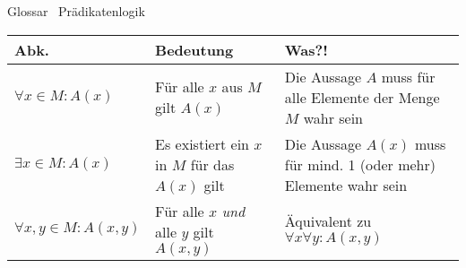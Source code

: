 \begin{frame}[fragile]{Glossar \textemdash\ Prädikatenlogik}
    \small
    \begin{tabular}{p{} p{} p{}}
        \toprule
        Abk.                         & Bedeutung                                        & Was?!                                                              \\
        \midrule
        $\forall x \in M : A(x)$     & Für alle $x$ aus $M$ gilt $A(x)$                 & Die Aussage $A$ muss für alle Elemente der Menge $M$ wahr sein     \\
        $\exists x \in M : A(x)$     & Es existiert ein $x$ in $M$ für das $A(x)$ gilt  & Die Aussage $A(x)$ muss für mind. 1 (oder mehr) Elemente wahr sein \\
        $\forall x,y \in M : A(x,y)$ & Für alle $x$ \textit{und} alle $y$ gilt $A(x,y)$ & Äquivalent zu $\forall x \forall y : A(x,y)$                       \\
        \bottomrule
    \end{tabular}
\end{frame}